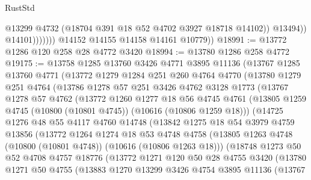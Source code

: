 \begin{lexlean}{RustStd}
\begin{coremodule}
                            @13299
                            @4732
                            (@18704 @391 @18 @52 @4702 @3927 @18718 @14102))
                          @13494))
                      @14101)))))))
        @14152
        @14155
        @14158
        @14161
        @10779))
@18991 := @13772 @1286 @120 @258 @28 @4772 @3420
@18994 := @13780 @1286 @258 @4772
@19175 := @13758
    @1285
    @13760
    @3426
    @4771
    @3895
    @11136
    (@13767
      @1285
      @13760
      @4771
      (@13772
        @1279
        @1284
        @251
        @260
        @4764
        @4770
        (@13780
          @1279
          @251
          @4764
          (@13786
            @1278
            @57
            @251
            @3426
            @4762
            @3128
            @1773
            (@13767
              @1278
              @57
              @4762
              (@13772
                @1260
                @1277
                @18
                @56
                @4745
                @4761
                (@13805 @1259 @4745 (@10800 (@10801 @4745)) (@10616 (@10806 @1259 @18)))
                (@14725
                  @1276
                  @48
                  @55
                  @4117
                  @4760
                  @14748
                  (@13842
                    @1275
                    @18
                    @54
                    @3979
                    @4759
                    @13856
                    (@13772
                      @1264
                      @1274
                      @18
                      @53
                      @4748
                      @4758
                      (@13805 @1263 @4748 (@10800 (@10801 @4748)) (@10616 (@10806 @1263 @18)))
                      (@18748
                        @1273
                        @50
                        @52
                        @4708
                        @4757
                        @18776
                        (@13772
                          @1271
                          @120
                          @50
                          @28
                          @4755
                          @3420
                          (@13780
                            @1271
                            @50
                            @4755
                            (@13883
                              @1270
                              @13299
                              @3426
                              @4754
                              @3895
                              @11136
                              (@13767

\end{coremodule}
\end{lexlean}

